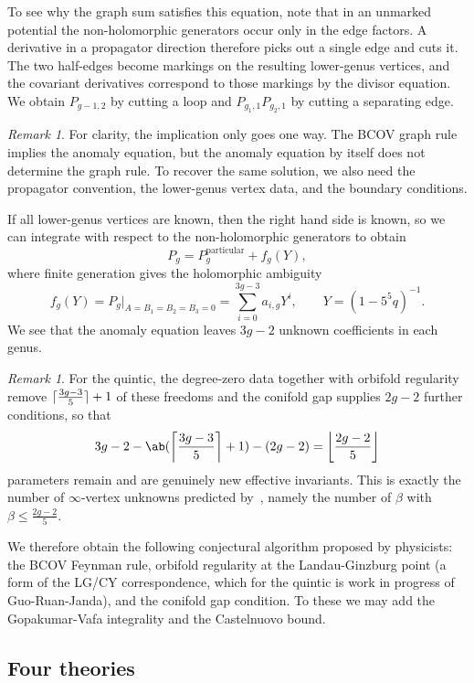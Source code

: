 \documentclass{amsart}
\theoremstyle{definition}
\theoremstyle{remark}
\newtheorem{rmk}[thm]{Remark}
\theoremstyle{plain}
\theoremstyle{definition}
\theoremstyle{remark}
\DeclarePairedDelimiter{\floor}{\lfloor}{\rfloor}
\DeclarePairedDelimiter{\ceil}{\lceil}{\rceil}
\newcommand{\mr}[1]{\mathrm{#1}}
\newcommand{\1}{\mathbf{1}}
\newcommand{\2}{\mathbf{2}}
\newcommand{\3}{\mathbf{3}}
\begin{document}
To see why the graph sum satisfies this equation, note that in an unmarked potential the non-holomorphic generators occur only in the edge factors. A derivative in a propagator direction therefore picks out a single edge and cuts it. The two half-edges become markings on the resulting lower-genus vertices, and the covariant derivatives correspond to those markings by the divisor equation. We obtain \(P_{g-1,2}\) by cutting a loop and \(P_{g_1,1}P_{g_2,1}\) by cutting a separating edge.

\begin{rmk}
    For clarity, the implication only goes one way. The BCOV graph rule implies the anomaly equation, but the anomaly equation by itself does not determine the graph rule. To recover the same solution, we also need the propagator convention, the lower-genus vertex data, and the boundary conditions.
\end{rmk}

If all lower-genus vertices are known, then the right hand side is known, so we can integrate with respect to the non-holomorphic generators to obtain
\[ P_g = P_g^{\mr{particular}} + f_g(Y), \]
where finite generation gives the holomorphic ambiguity
\[ f_g(Y) = P_g|_{A = B_1 = B_2 = B_3 = 0} = \sum_{i=0}^{3g-3}a_{i,g}Y^i, \qquad Y = (1-5^5q)^{-1}. \]
We see that the anomaly equation leaves \(3g-2\) unknown coefficients in each genus.

\begin{rmk}
    For the quintic, the degree-zero data together with orbifold regularity remove \(\ceil{\frac{3g-3}{5}}+1\) of these freedoms and the conifold gap supplies \(2g-2\) further conditions, so that
    \[ 3g-2 - \ab(\ceil*{\frac{3g-3}{5}}+1) - (2g-2) = \floor*{\frac{2g-2}{5}} \]
    parameters remain and are genuinely new effective invariants. This is exactly the number of \(\infty\)-vertex unknowns predicted by~, namely the number of \(\beta\) with \(\beta \leq \frac{2g-2}{5}\).
\end{rmk}

We therefore obtain the following conjectural algorithm proposed by physicists: the BCOV Feynman rule, orbifold regularity at the Landau-Ginzburg point (a form of the LG/CY correspondence, which for the quintic is work in progress of Guo-Ruan-Janda), and the conifold gap condition. To these we may add the Gopakumar-Vafa integrality and the Castelnuovo bound.

\subsection{Four theories}%
\label{sub:Four theories}
\end{document}
